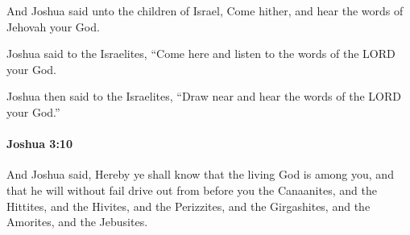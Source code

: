 			\begin{versebox}
					\item[BHS] 
					\item[ASV] And Joshua said unto the children of Israel, Come hither, and hear the words of Jehovah your God.
					\item[NIV] Joshua said to the Israelites, “Come here and listen to the words of the LORD your God.
					\item[NRSV] Joshua then said to the Israelites, “Draw near and hear the words of the LORD your God.”
			\end{versebox}

		\paragraph{Joshua 3:10} %
			\label{JOSHUA-3-10}

			And Joshua said, Hereby ye shall know that the living God is among you, and that he will without fail drive out from before you the Canaanites, and the Hittites, and the Hivites, and the Perizzites, and the Girgashites, and the Amorites, and the Jebusites.

